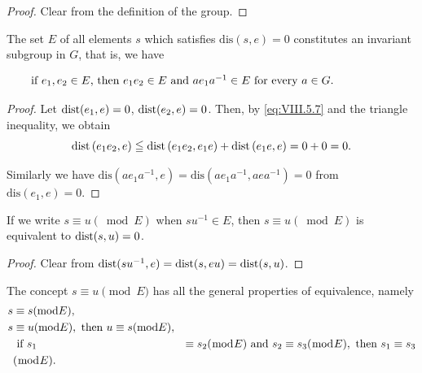\begin{proof}
 Clear from the definition of the group. 
\end{proof}

\begin{corollary}\label{cor:VIII.5.Corollary.1} The set $E$ of all elements $s$ which satisfies $\mathrm{dis}(s, e) = 0$ constitutes an invariant subgroup in $G$, that is, we have 

\begin{equation}\label{eq:VIII.5.8}
\begin{minipage}[b]{0.92\linewidth}
if $e_1, e_2 \in E$, then $e_1e_2 \in E$ and $ae_1a^{-1} \in E$ for every $a \in G$.
\end{minipage}
\end{equation}
\end{corollary}


\begin{proof}
 Let $\operatorname{dist}(e_1, e) = 0$, $\operatorname{dist}(e_2, e) = 0$. Then, by \eqref{eq:VIII.5.7} and the triangle inequality, we obtain 
\[
\operatorname{dist} \left(e _{1} e _{2}, e\right) \leqq \operatorname{dist} \left(e _{1} e _{2}, e _{1} e\right) + \operatorname{dist} \left(e _{1} e, e\right) = 0 + 0 = 0. \]

Similarly we have $\mathrm{dis}(ae_1a^{-1},e) = \mathrm{dis}(ae_1a^{-1},aea^{-1}) = 0$ from $\mathrm{dis}(e_1,e) = 0$. 
\end{proof}

\begin{corollary}\label{cor:VIII.5.Corollary.2} If we write $s \equiv u (\bmod E)$ when $su^{-1} \in E$, then $s \equiv u (\bmod E)$ is equivalent to $\operatorname{dist}(s, u) = 0$. 
\end{corollary}

\begin{proof}
 Clear from $\operatorname{dist}(su^{-1}, e) = \operatorname{dist}(s, eu) = \operatorname{dist}(s, u)$. 
\end{proof}

\begin{corollary}\label{cor:VIII.5.Corollary.3} The concept $s \equiv u \pmod{E}$ has all the general properties of equivalence, namely 
\begin{align}
s& \equiv s (\mathrm{mod} E), \label{eq:VIII.5.9} \\
s& \equiv u (\mathrm{mod} E), \text{ then } u \equiv s (\mathrm{mod} E), \label{eq:VIII.5.10} \\
& \text{ if } s _{1}& \equiv s _{2} (\bmod E) \text{ and } s _{2} \equiv s _{3} (\bmod E), \text{ then } s _{1} \equiv s _{3} \notag
\\
& (\bmod E). \label{eq:VIII.5.11}
\end{align}
\end{corollary}

